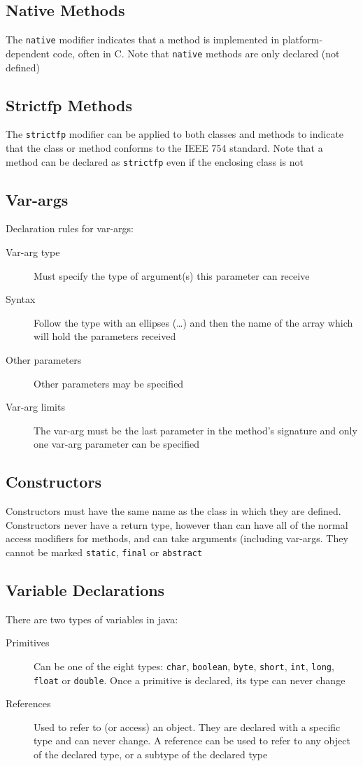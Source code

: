 \subsection{Native Methods}
The \verb#native# modifier indicates that a method is implemented in 
platform-dependent code, often in C. Note that \verb#native# methods are only 
declared (not defined)

\subsection{Strictfp Methods}
The \verb#strictfp# modifier can be applied to both classes and methods to 
indicate that the class or method conforms to the IEEE 754 standard. Note that 
a method can be declared as \verb#strictfp# even if the enclosing class is not

\subsection{Var-args}
Declaration rules for var-args:
\begin{description}
    \item[Var-arg type] Must specify the type of argument(s) this parameter can
    receive
    \item[Syntax] Follow the type with an ellipses (\ldots) and then the name 
    of the array which will hold the parameters received
    \item[Other parameters] Other parameters may be specified
    \item[Var-arg limits] The var-arg must be the last parameter in the
    method's signature and only one var-arg parameter can be 
    specified
\end{description}

\subsection{Constructors}
Constructors must have the same name as the class in which they are defined.
Constructors never have a return type, however than can have all of the normal 
access modifiers for methods, and can take arguments (including var-args. They 
cannot be marked \verb#static#, \verb#final# or \verb#abstract#

\subsection{Variable Declarations}
There are two types of variables in java:
\begin{description}
    \item[Primitives] Can be one of the eight types: \verb#char#, 
    \verb#boolean#, \verb#byte#, \verb#short#, \verb#int#, \verb#long#, 
    \verb#float# or \verb#double#. Once a primitive is declared, its type can 
    never change
    \item[References] Used to refer to (or access) an object. They are declared 
    with a specific type and can never change. A reference can be used to refer 
    to any object of the declared type, or a subtype of the declared type
\end{description}


